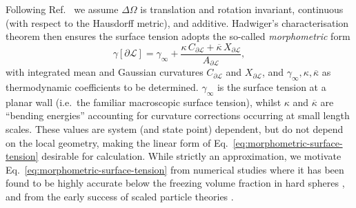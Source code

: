 \documentclass[11pt,twoside]{report}
\begin{document}
Following Ref.\ \cite{Konig2004} we assume $\Delta\Omega$ is translation and rotation invariant, continuous (with respect to the Hausdorff metric), and additive.
Hadwiger's characterisation theorem \cite{Hadwiger1957} then ensures the surface tension adopts the so-called \emph{morphometric} form
\begin{equation}\label{eq:morphometric-surface-tension}
  \gamma[\partial\mathcal{L}] =
  \gamma_\infty +
  \frac{\kappa \, C_{\partial\mathcal{L}} + \overline{\kappa} \, X_{\partial\mathcal{L}}}
       {A_{\partial\mathcal{L}}},
\end{equation}
with integrated mean and Gaussian curvatures $C_{\partial\mathcal{L}}$ and $X_{\partial\mathcal{L}}$, and $\gamma_\infty,\kappa,\overline{\kappa}$ as thermodynamic coefficients to be determined.
$\gamma_\infty$ is the surface tension at a planar wall (i.e.\ the familiar macroscopic surface tension), whilst $\kappa$ and $\overline{\kappa}$ are ``bending energies'' accounting for curvature corrections occurring at small length scales.
These values are system (and state point) dependent, but do not depend on the local geometry, making the linear form of Eq.\ \eqref{eq:morphometric-surface-tension} desirable for calculation.
While strictly an approximation, we motivate Eq.\ \eqref{eq:morphometric-surface-tension} from numerical studies where it has been found to be highly accurate below the freezing volume fraction in hard spheres \cite{Roth2006,Laird2012,Blokhuis2013,Urrutia2014,Hansen-Goos2014}, and from the early success of scaled particle theories \cite{Reiss1959,Reiss1960}.

\end{document}
